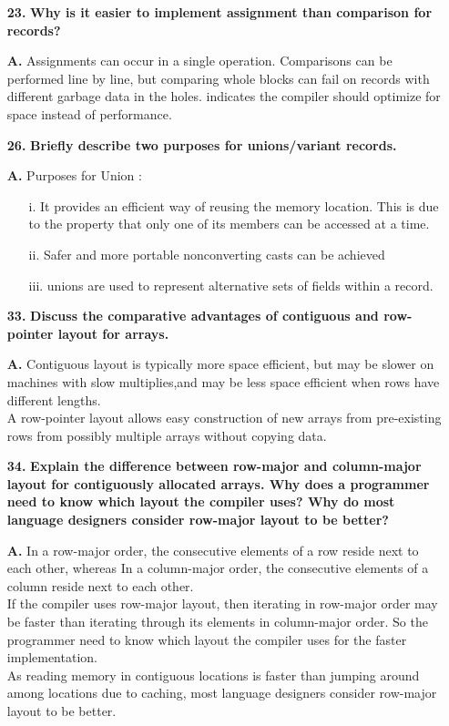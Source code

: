 \documentclass[letterpaper]{article}
\begin{document}
\begin{large}
\begin{flushleft}
\begin{enumerate}
\item[\textbf{23.}]
\textbf{Why is it easier to implement assignment than comparison for records? }
\item[\textbf{A.}]
Assignments can occur in a single operation. Comparisons can be performed line by line, but comparing whole blocks can fail on records with different garbage data in the holes. indicates the compiler should optimize for space instead of performance.\\[0.2in]

\item[\textbf{26.}]
\textbf{Briefly describe two purposes for unions/variant records.}
\item[\textbf{A.}]
Purposes for Union :\\
\begin{enumerate}
\item[i.]
It provides an efficient way of reusing the memory location. This is due to the property that only one of its members can be accessed at a time.\\
\item[ii.]
Safer and more portable nonconverting casts can be achieved\\
\item[iii.]
unions are used to represent alternative sets of fields within a record.\\[0.2in]
\end{enumerate}

\item[\textbf{33.}]
\textbf{Discuss the comparative advantages of contiguous and row-pointer layout for arrays.}
\item[\textbf{A.}]
Contiguous layout is typically more space efficient, but may be slower on
machines with slow multiplies,and may be less space efficient when rows have
different lengths.\\
A row-pointer
layout allows easy construction of new arrays from pre-existing rows from
possibly multiple arrays without copying data.\\[0.2in]
 
\item[\textbf{34.}]
\textbf{Explain the difference between row-major and column-major layout for contiguously allocated arrays. Why does a programmer need to know which layout
the compiler uses? Why do most language designers consider row-major layout
to be better?}
\item[\textbf{A.}]
In a row-major order, the consecutive elements of a row reside next to each other, whereas In a column-major order, the consecutive elements of a column reside next to each other.\\
If the compiler uses row-major layout, then iterating in row-major order may be faster than iterating through its elements in column-major order. So the programmer need to know which layout the compiler uses for the faster implementation.\\
As reading memory in contiguous locations is faster than jumping around among
locations due to caching, most language designers consider row-major layout to be better.\\[0.2in] 


\end{enumerate}
\end{flushleft}
\end{large}
\end{document}
